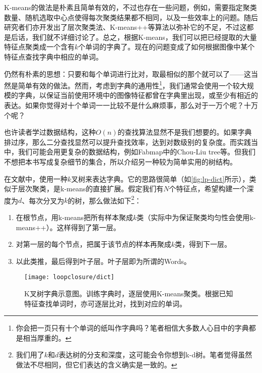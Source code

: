 K-means的做法是朴素且简单有效的，不过也存在一些问题，例如，需要指定聚类数量、随机选取中心点使得每次聚类结果都不相同，以及一些效率上的问题。随后研究者们亦开发出了层次聚类法、K-means++\textsuperscript{\cite{Arthur2007}}等算法以弥补它的不足，不过这都是后话，我们就不详细讨论了。总之，根据K-means，我们可以把已经提取的大量特征点聚类成一个含有$k$个单词的字典了。现在的问题变成了如何根据图像中某个特征点查找字典中相应的单词。

仍然有朴素的思想：只要和每个单词进行比对，取最相似的那个就可以了——这当然是简单有效的做法。然而，考虑到字典的通用性\footnote{你会把一页只有十个单词的纸叫作字典吗？笔者相信大多数人心目中的字典都是相当厚重的。}，我们通常会使用一个较大规模的字典，以保证当前使用环境中的图像特征都曾在字典里出现，或至少有相近的表达。如果你觉得对十个单词一一比较不是什么麻烦事，那么对于一万个呢？十万个呢？

也许读者学过数据结构，这种$O(n)$的查找算法显然不是我们想要的。如果字典排过序，那么二分查找显然可以提升查找效率，达到对数级别的复杂度。而实践当中，我们可能会用更复杂的数据结构，例如Fabmap\textsuperscript{\cite{Cummins2008, Cummins2010, Cummins2011}}中的Chou-Liu tree\textsuperscript{\cite{Chow1968}}等。但我们不想把本书写成复杂细节的集合，所以介绍另一种较为简单实用的树结构\textsuperscript{\cite{Galvez-Lopez2012}}。

在文献\cite{Galvez-Lopez2012}中，使用一种$k$叉树来表达字典。它的思路很简单（如\autoref{fig:lp-dict}所示），类似于层次聚类，是k-means的直接扩展。假定我们有$N$个特征点，希望构建一个深度为$d$、每次分叉为$k$的树，那么做法如下\footnote{我们用了$k$和$d$表达树的分支和深度，这可能会令你想到k-d树\textsuperscript{\cite{Bentley1975}}。笔者觉得虽然做法不尽相同，但它们表达的含义确实是一致的。}：

\begin{mdframed}
\begin{enumerate}
	\item 在根节点，用k-means把所有样本聚成$k$类（实际中为保证聚类均匀性会使用k-means++）。这样得到了第一层。
	\item 对第一层的每个节点，把属于该节点的样本再聚成$k$类，得到下一层。
	\item 以此类推，最后得到叶子层。叶子层即为所谓的Words。
\end{enumerate}
\end{mdframed}

\begin{figure}[!ht]
	\centering
	\texttt{[image: loopclosure/dict]}
	\caption{K叉树字典示意图。训练字典时，逐层使用K-means聚类。根据已知特征查找单词时，亦可逐层比对，找到对应的单词。}
	\label{fig:lp-dict}
\end{figure}


